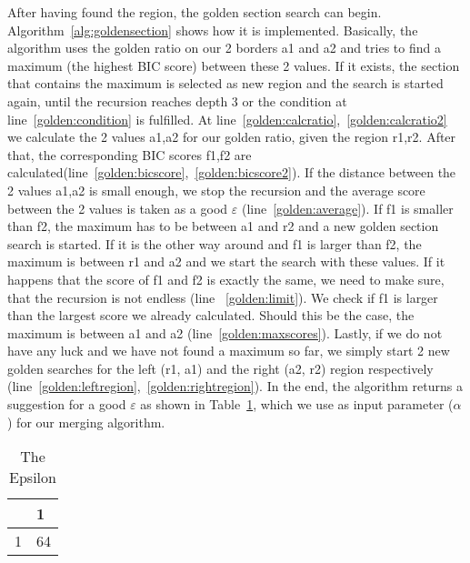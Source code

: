 \documentclass[
a4paper,
12pt
]{scrartcl}
\newcommand{\gray}{\cellcolor{grayself}}  %
\begin{document}
After having found the region, the golden section search can begin. Algorithm~\ref{alg:goldensection} shows how it is implemented. Basically, the algorithm uses the golden ratio on our 2 borders a1 and a2 and tries to find a maximum (the highest BIC score) between these 2 values. If it exists, the section that contains the maximum is selected as new region and the search is started again, until the recursion reaches depth 3 or the condition at line~\ref{golden:condition} is fulfilled. At line~\ref{golden:calcratio},~\ref{golden:calcratio2} we calculate the 2 values a1,a2 for our golden ratio, given the region r1,r2. After that, the corresponding BIC scores f1,f2 are calculated(line~\ref{golden:bicscore},~\ref{golden:bicscore2}). If the distance between the 2 values a1,a2 is small enough, we stop the recursion and the average score between the 2 values is taken as a good $\varepsilon$ (line~\ref{golden:average}). If f1 is smaller than f2, the maximum has to be between a1 and r2 and a new golden section search is started. If it is the other way around and f1 is larger than f2, the maximum is between r1 and a2 and we start the search with these values.
If it happens that the score of f1 and f2 is exactly the same, we need to make sure, that the recursion is not endless (line ~\ref{golden:limit}). We check if f1 is larger than the largest score we already calculated. Should this be the case, the maximum is between a1 and a2 (line~\ref{golden:maxscores}). Lastly, if we do not have any luck and we have not found a maximum so far, we simply start 2 new golden searches for the left (r1, a1) and the right (a2, r2) region respectively (line~\ref{golden:leftregion},~\ref{golden:rightregion}). In the end, the algorithm returns a suggestion for a good $\varepsilon$ as shown in Table~\ref{table:goodepsilon}, which we use as input parameter ($\alpha$) for our merging algorithm.

\begin{table}[ht!]
\centering
\begin{tabular}{|l|l|}
\hline
\gray &\gray 1 \\ \hline
\gray 1&64 \\ \hline
\end{tabular}
\caption{The Epsilon}
\label{table:goodepsilon}
\end{table}
\end{document}
